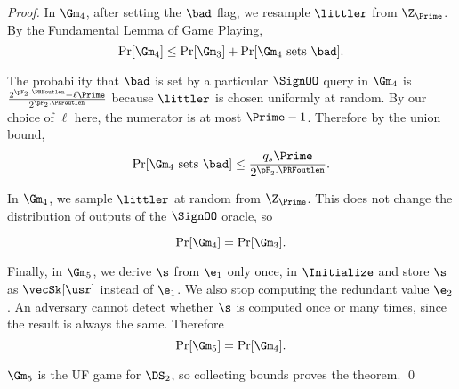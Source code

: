 \begin{proof}
	In $\Gm_4$, after setting the $\bad$ flag, we resample $\littler$ from $\Z_\Prime$. By the Fundamental Lemma of Game Playing,
	\[\Pr[\Gm_4] \leq \Pr[\Gm_3] + \Pr[\Gm_4 \text{ sets } \bad]. \]
	
	The probability that $\bad$ is set by a particular $\SignOO$ query in $\Gm_4$ is $\frac{2^{\pF_2.\PRFoutlen} - \ell\Prime}{2^{\pF_2.\PRFoutlen}}$ because $\littler$ is chosen uniformly at random. 
	By our choice of $\ell$ here, the numerator is at most $\Prime - 1$. Therefore by the union bound, \[\Pr[\Gm_4 \text{ sets } \bad] \leq \frac{q_s \Prime} {2^{\pF_2.\PRFoutlen}}.\]
	
	In $\Gm_4$, we sample $\littler$ at random from $\Z_\Prime$. This does not change the distribution of outputs of the $\SignOO$ oracle, so 
	
	\[\Pr[\Gm_4] = \Pr[\Gm_3]. \]
	
	Finally, in $\Gm_5$, we derive $\s$ from $\e_1$ only once, in $\Initialize$ and store $\s$ as $\vecSk[\usr]$ instead of $\e_1$. We also stop computing the redundant value $\e_2$. An adversary cannot detect whether $\s$ is computed once or many times, since the result is always the same. Therefore
	\[ \Pr[\Gm_5]=\Pr[\Gm_4]. \]
	
	$\Gm_5$ is the UF game for $\DS_2$, so collecting bounds proves the theorem. \qed
\end{proof}

